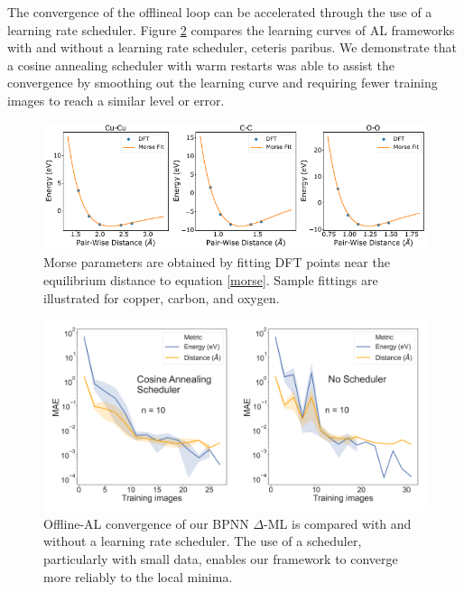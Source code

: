 \documentclass[%
 reprint,
 amsmath,amssymb,
 aps,
]{revtex4-2}
\begin{document}
The convergence of the \gls{offlineal} loop can be accelerated through the use of a learning rate scheduler. Figure \ref{fig:scheduler} compares the learning curves of AL frameworks with and without a learning rate scheduler, ceteris paribus. We demonstrate that a cosine annealing scheduler with warm restarts \cite{loshchilov2016sgdr} was able to assist the convergence by smoothing out the learning curve and requiring fewer training images to reach a similar level or error.

\begin{figure}[!th]
    \centering
    \includegraphics[width=\textwidth]{figures/figure_S1.pdf}
    \caption{Morse parameters are obtained by fitting DFT points near the equilibrium distance to equation \ref{morse}. Sample fittings are illustrated for copper, carbon, and oxygen.} 
    \label{fig:morsefit}
\end{figure}  

\begin{figure}
    \centering
    \includegraphics[width=\textwidth]{figures/figure_S2.pdf}
    \caption{Offline-AL convergence of our BPNN $\Delta$-ML is compared with and without a learning rate scheduler. The use of a scheduler, particularly with small data, enables our framework to converge more reliably to the local minima.}
    \label{fig:scheduler}
\end{figure}
\end{document}
